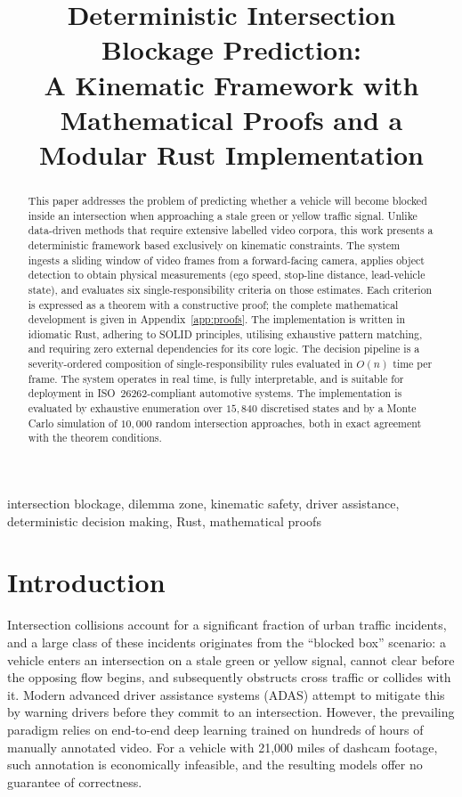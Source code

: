 \documentclass[conference, a4paper]{IEEEtran}
\title{Deterministic Intersection Blockage Prediction:\\A Kinematic Framework with Mathematical Proofs and a Modular Rust Implementation}
\author{\IEEEauthorblockN{Arpan Pathak}
\IEEEauthorblockA{Driving CivicSense Research}}
\date{}
\theoremstyle{plain}
\begin{document}
\maketitle

\begin{abstract}
This paper addresses the problem of predicting whether a vehicle will become
blocked inside an intersection when approaching a stale green or yellow
traffic signal. Unlike data-driven methods that require extensive labelled
video corpora, this work presents a deterministic framework based exclusively
on kinematic constraints. The system ingests a sliding window of video frames
from a forward-facing camera, applies object detection to obtain physical
measurements (ego speed, stop-line distance, lead-vehicle state), and
evaluates six single-responsibility criteria on those estimates. Each criterion is
expressed as a theorem with a constructive proof; the complete mathematical
development is given in Appendix~\ref{app:proofs}. The implementation is
written in idiomatic Rust, adhering to SOLID principles, utilising exhaustive
pattern matching, and requiring zero external dependencies for its core
logic. The decision pipeline is a severity-ordered composition of
single-responsibility rules evaluated in $O(n)$ time per frame. The
system operates in real time, is fully interpretable, and is suitable for
deployment in ISO~26262-compliant automotive systems. The implementation
is evaluated by exhaustive enumeration over $15{,}840$ discretised states and
by a Monte Carlo simulation of $10{,}000$ random intersection approaches,
both in exact agreement with the theorem conditions.
\end{abstract}

\begin{IEEEkeywords}
intersection blockage, dilemma zone, kinematic safety, driver assistance,
deterministic decision making, Rust, mathematical proofs
\end{IEEEkeywords}

\section{Introduction}
\label{sec:intro}

Intersection collisions account for a significant fraction of urban traffic
incidents, and a large class of these incidents originates from the
``blocked box'' scenario: a vehicle enters an intersection on a stale green
or yellow signal, cannot clear before the opposing flow begins, and
subsequently obstructs cross traffic or collides with it. Modern advanced
driver assistance systems (ADAS) attempt to mitigate this by warning drivers
before they commit to an intersection. However, the prevailing paradigm
relies on end-to-end deep learning trained on hundreds of hours of manually
annotated video. For a vehicle with 21{,}000 miles of dashcam footage, such
annotation is economically infeasible, and the resulting models offer no
guarantee of correctness.
\end{document}
